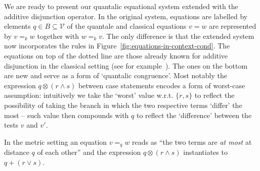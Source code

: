 \documentclass[a4paper,UKenglish,cleveref, autoref, thm-restate]{lipics-v2021}
\begin{document}
We are ready to present our quantalic equational system extended with the
additive disjunction operator.  In the original system, equations are labelled
by elements $q \in B \subseteq \mathcal{V}$ of the quantale and classical
equations $v = w$ are represented by $v =_k w$ together with $w =_k v$. The
only difference is that the extended system now incorporates the rules in
Figure~\ref{fig:equations-in-context-cond}. The equations on top of the dotted
line are those already known for additive disjunction in the classical setting
(see for example~\cite{croleCategoriesTypes1994}). The ones on the bottom are
new and serve as a form of `quantalic congruence'. Most notably the expression
$q \otimes (r \wedge s)$ between case statements encodes a form of worst-case
assumption: intuitively we take the `worst' value w.r.t. $\{r, s\}$ to reflect
the possibility of taking the branch in which the two respective terms `differ'
the most -- such value then compounds with $q$ to reflect the `difference'
between the tests $v$ and $v'$.

In the metric setting an equation $v =_q w$ reads as ``the two terms are
\emph{at most} at distance $q$ of each other'' and the expression $q \otimes (r
\wedge s)$ instantiates to $q + (r \vee s)$.
\end{document}
